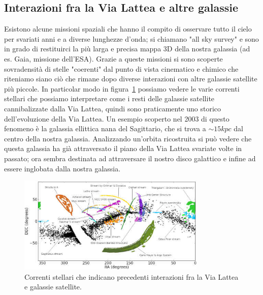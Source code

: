 \subsection{Interazioni fra la Via Lattea e altre galassie}
Esistono alcune missioni spaziali che hanno il compito di osservare tutto il cielo per svariati anni e a diverse lunghezze d’onda; si chiamano "all sky survey" e sono in grado di restituirci la più larga e precisa mappa 3D della nostra galassia (ad es. Gaia, missione dell'ESA). Grazie a queste missioni si sono scoperte sovradensità di stelle "coerenti" dal punto di vista cinematico e chimico che riteniamo siano ciò che rimane dopo diverse interazioni con altre galassie satellite più piccole. In particolar modo in figura~\ref{fig:interazioni-via-lattea} possiamo vedere le varie correnti stellari che possiamo interpretare come i resti delle galassie satellite cannibalizzate dalla Via Lattea, quindi sono praticamente uno storico dell'evoluzione della Via Lattea. Un esempio scoperto nel 2003 di questo fenomeno è la galassia ellittica nana del Sagittario, che si trova a $\sim 15 \si{kpc}$ dal centro della nostra galassia. Analizzando un'orbita ricostruita si può vedere che questa galassia ha già attraversato il piano della Via Lattea svariate volte in passato; ora sembra destinata ad attraversare il nostro disco galattico  e infine ad essere inglobata dalla nostra galassia.

\begin{figure}
    \centering
    \includegraphics[width = 0.8\textwidth]{immagini/interazioni-via-lattea.jpg}
    \caption{Correnti stellari che indicano precedenti interazioni fra la Via Lattea e galassie satellite.}
    \label{fig:interazioni-via-lattea}
\end{figure}